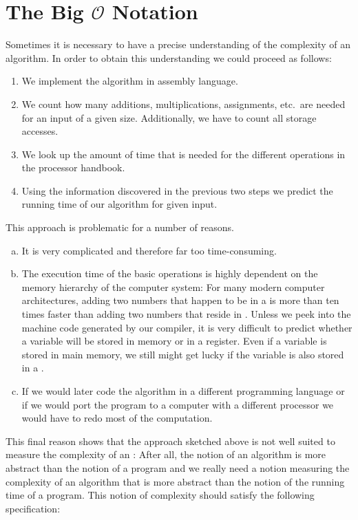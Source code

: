 \section{The Big $\mathcal{O}$ Notation}
Sometimes it is necessary to have a precise understanding of the complexity of an algorithm.  
In order to obtain this understanding we could proceed as follows:  
\begin{enumerate}
\item We implement the algorithm in assembly language.
\item We count how many additions, multiplications, assignments, etc.~are needed
      for an input of a given size.  Additionally, we have to count all storage accesses.
\item We look up the amount of time that is needed for the different operations in the processor handbook.
\item Using the information discovered in the previous two steps we predict the running
      time of our algorithm for given input.
\end{enumerate}
This approach is problematic for a number of reasons.
\begin{enumerate}[(a)]
\item It is very complicated and therefore far too time-consuming.
\item The execution time of the basic operations is highly dependent on the memory hierarchy of the
      computer system:  For many modern computer architectures, adding two numbers that happen to be
      in a  is more than ten times faster than adding two numbers that reside in
      .  Unless we peek into the machine code generated by our compiler, it is very difficult
      to predict whether a variable will be stored in memory or in a register.  Even if a variable
      is stored in main memory, we still might get lucky if the variable is also stored in a .
\item If we would later code the algorithm in a different programming language or if we would port
      the program to a computer with a different processor we would have to redo most of the
      computation. 
\end{enumerate}
This final reason shows that the approach sketched above is not well suited to measure the complexity of
an : After all, the notion of an algorithm is more abstract than the notion of a program
and we really need a notion measuring the complexity of an algorithm that is more abstract than the
notion of the running time of a program.  This notion of complexity should satisfy the following
specification:

